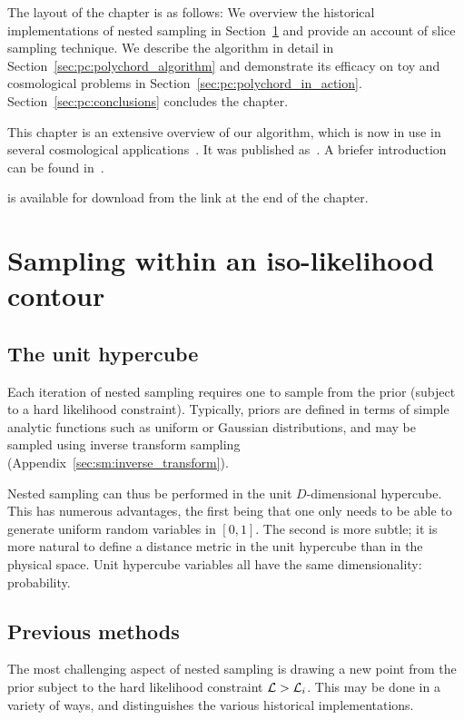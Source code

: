 The layout of the chapter is as follows:
We overview the historical implementations of nested sampling in Section~\ref{sec:pc:iso_likelihood_sampling} and provide an account of  slice sampling technique.
We describe the \PolyChord{} algorithm in detail in Section~\ref{sec:pc:polychord_algorithm} and demonstrate its efficacy on toy and cosmological problems in Section~\ref{sec:pc:polychord_in_action}.  
Section~\ref{sec:pc:conclusions} concludes the chapter.

This chapter is an extensive overview of our algorithm, which is now in use in several cosmological applications~\citep{planck2015-a24}. It was published as~\cite{polychordpaper}. A briefer introduction can be found in~\cite{polychordletter}.

\PolyChord{} is available for download from the link at the end of the chapter.







\section{Sampling within an iso-likelihood contour}
\label{sec:pc:iso_likelihood_sampling}

\subsection{The unit hypercube}
\label{sec:bay:unit_hypercube}
Each iteration of nested sampling requires one to sample from the prior (subject to a hard likelihood constraint). 
Typically, priors are defined in terms of simple analytic functions such as uniform or Gaussian distributions, and may be sampled using  inverse transform sampling (Appendix~\ref{sec:sm:inverse_transform}). 

Nested sampling can thus be performed in the unit \(D\)-dimensional hypercube. This has numerous advantages, the first being that one only needs to be able to generate uniform random variables in \([0,1]\). The second is more subtle; it is more natural to define a distance metric in the unit hypercube than in the physical space. Unit hypercube variables all have the same dimensionality: probability.



\subsection{Previous methods}
\label{sec:pc:previous_methods}
The most challenging aspect of nested sampling is drawing a new point from the prior subject to the hard likelihood constraint \(\mathcal{L}>\mathcal{L}_i\). This may be done in a variety of ways, and distinguishes the various historical implementations.

